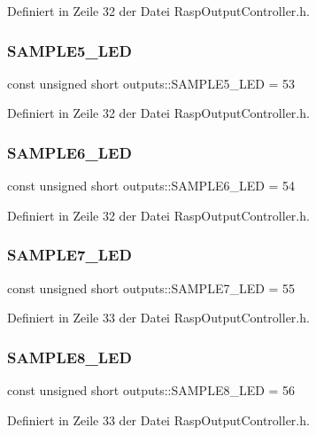 Definiert in Zeile 32 der Datei Rasp\+Output\+Controller.\+h.

\mbox{\label{namespaceoutputs_a87e2d51fbeb2ac9fd23fc5d937b1c7c2}} 
\subsubsection{\texorpdfstring{S\+A\+M\+P\+L\+E5\+\_\+\+L\+ED}{SAMPLE5\_LED}}
{\footnotesize\ttfamily const unsigned short outputs\+::\+S\+A\+M\+P\+L\+E5\+\_\+\+L\+ED = 53}



Definiert in Zeile 32 der Datei Rasp\+Output\+Controller.\+h.

\mbox{\label{namespaceoutputs_a7bdee2eb9fc676ac7edb9582334be15a}} 
\subsubsection{\texorpdfstring{S\+A\+M\+P\+L\+E6\+\_\+\+L\+ED}{SAMPLE6\_LED}}
{\footnotesize\ttfamily const unsigned short outputs\+::\+S\+A\+M\+P\+L\+E6\+\_\+\+L\+ED = 54}



Definiert in Zeile 32 der Datei Rasp\+Output\+Controller.\+h.

\mbox{\label{namespaceoutputs_a3d438bc8ce91fb825bf2da7834ac639e}} 
\subsubsection{\texorpdfstring{S\+A\+M\+P\+L\+E7\+\_\+\+L\+ED}{SAMPLE7\_LED}}
{\footnotesize\ttfamily const unsigned short outputs\+::\+S\+A\+M\+P\+L\+E7\+\_\+\+L\+ED = 55}



Definiert in Zeile 33 der Datei Rasp\+Output\+Controller.\+h.

\mbox{\label{namespaceoutputs_ac6e07c06d1d512716e6309db54648440}} 
\subsubsection{\texorpdfstring{S\+A\+M\+P\+L\+E8\+\_\+\+L\+ED}{SAMPLE8\_LED}}
{\footnotesize\ttfamily const unsigned short outputs\+::\+S\+A\+M\+P\+L\+E8\+\_\+\+L\+ED = 56}



Definiert in Zeile 33 der Datei Rasp\+Output\+Controller.\+h.

